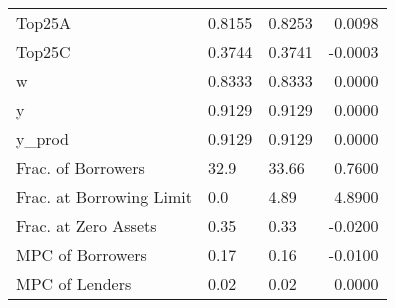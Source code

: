 \begin{table}
\begin{tabular}{lllr}
                  Top25A &  0.8155 &   0.8253 &  0.0098 \\
                  Top25C &  0.3744 &   0.3741 & -0.0003 \\
                       w &  0.8333 &   0.8333 &  0.0000 \\
                       y &  0.9129 &   0.9129 &  0.0000 \\
                  y\_prod &  0.9129 &   0.9129 &  0.0000 \\
      Frac. of Borrowers &    32.9 &    33.66 &  0.7600 \\
Frac. at Borrowing Limit &     0.0 &     4.89 &  4.8900 \\
    Frac. at Zero Assets &    0.35 &     0.33 & -0.0200 \\
        MPC of Borrowers &    0.17 &     0.16 & -0.0100 \\
          MPC of Lenders &    0.02 &     0.02 &  0.0000 \\
\bottomrule
\end{tabular}
\end{table}
